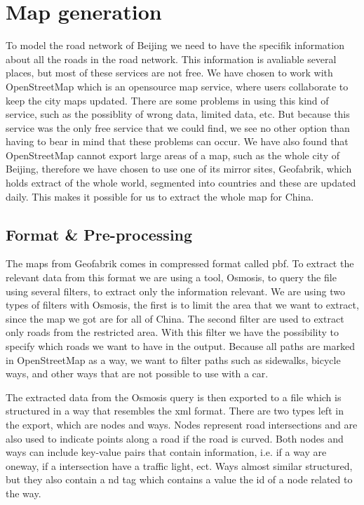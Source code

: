 \section{Map generation}
To model the road network of Beijing we need to have the specifik information about all the roads in the road network. This information is avaliable several places, but most of these services are not free. We have chosen to work with OpenStreetMap which is an opensource map service, where users collaborate to keep the city maps updated. There are some problems in using this kind of service, such as the possiblity of wrong data, limited data, etc. But because this service was the only free service that we could find, we see no other option than having to bear in mind that these problems can occur. We have also found that OpenStreetMap cannot export large areas of a map, such as the whole city of Beijing, therefore we have chosen to use one of its mirror sites, Geofabrik, which holds extract of the whole world, segmented into countries and these are updated daily. This makes it possible for us to extract the whole map for China.

\subsection{Format \& Pre-processing}
The maps from Geofabrik comes in compressed format called pbf. To extract the relevant data from this format we are using a tool, Osmosis, to query the file using several filters, to extract only the information relevant.
We are using two types of filters with Osmosis, the first is to limit the area that we want to extract, since the map we got are for all of China. The second filter are used to extract only roads from the restricted area.
With this filter we have the possibility to specify which roads we want to have in the output. Because all paths are marked in OpenStreetMap as a way, we want to filter paths such as sidewalks, bicycle ways, and other ways that are not possible to use with a car.

The extracted data from the Osmosis query is then exported to a file which is structured in a way that resembles the xml format. There are two types left in the export, which are nodes and ways. Nodes represent road intersections and are also used to indicate points along a road if the road is curved. Both nodes and ways can include key-value pairs that contain information, i.e. if a way are oneway, if a intersection have a traffic light, ect.
Ways almost similar structured, but they also contain a nd tag which contains a value the id of a node related to the way.

